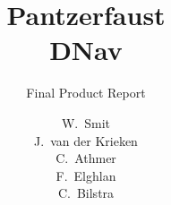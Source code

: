 \documentclass[oneside, whitelogo]{tudelft-report}
\begin{document}
	
	\frontmatter
	
	\title{Pantzerfaust\\DNav}
	\subtitle[tudelft-white]{Final Product Report}
	\author[tudelft-white]{
		W.\ Smit\\
		J.\ van der Krieken\\
		C.\ Athmer\\
		F.\ Elghlan\\
		C.\ Bilstra\\
	}
	\titleoffsetx{1cm}
	\titleoffsety{6.5cm}
	\afiloffsetx{1cm} 
	\afiloffsety{18cm} 
	
	\makecover
	
	
	
	\tableofcontents
	
	
	\mainmatter
	
	
	
	
	
	
	
%	
	
	
	
	
	\appendix
	
	
	
	
	\nocite{*}
	
\end{document}
